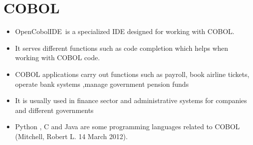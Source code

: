 \documentclass{article}
\begin{document}
	\section{COBOL}
	\begin{itemize}
		\item OpenCobolIDE is a specialized IDE designed for working with COBOL.
		\item It serves different functions such as code completion which helps when working with COBOL code.
		\item COBOL applications carry out functions such as payroll, book airline tickets, operate bank systems ,manage government pension funds
		\item It is usually used in finance sector  and administrative systems for companies and  different governments
		\item Python , C and Java are some programming languages related to COBOL
		(Mitchell, Robert L. 14 March 2012). 
		
	\end{itemize}
\end{document}

